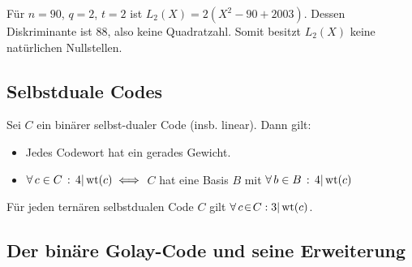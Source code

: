\documentclass{cheat-sheet}
\DeclareMathOperator{\wt}{wt} %
\newcommand{\divides}{|} %
\begin{document}
\begin{samepage}

\begin{bsp}
  Für $n=90$, $q=2$, $t=2$ ist $L_2(X) = 2 (X^2 - 90 + 2003)$.
  Dessen Diskriminante ist $88$, also keine Quadratzahl.
  Somit besitzt $L_2(X)$ keine natürlichen Nullstellen.
\end{bsp}

\subsection{Selbstduale Codes}

\begin{prop}
  Sei $C$ ein binärer selbst-dualer Code (insb. linear).
  Dann gilt:
  \begin{itemize}
    \item Jedes Codewort hat ein gerades Gewicht.
    \item $\fa{c \in C} 4 \divides \wt(c) \iff$ $C$ hat eine Basis $B$ mit $\fa{b \in B} 4 \divides \wt(c)$
  \end{itemize}
\end{prop}

\begin{prop}
  Für jeden ternären selbstdualen Code $C$ gilt $\fa{c \!\in\! C\!}\! 3 \divides \wt(c)$.
\end{prop}

\subsection{Der binäre Golay-Code und seine Erweiterung}

\end{samepage}
\end{document}
